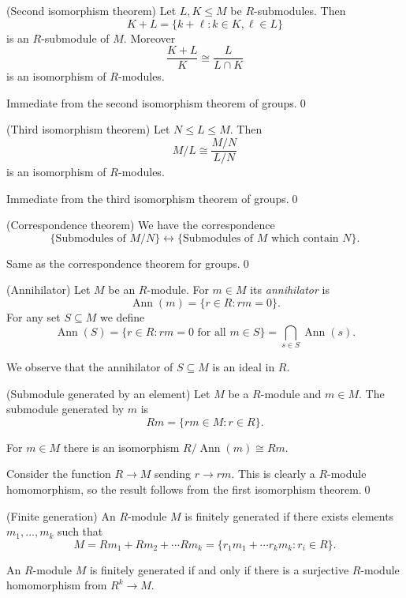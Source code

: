 \documentclass{article}
\DeclareMathOperator{\Ann}{Ann}
\begin{document}
\begin{itemize}
\begin{theorem}
	(Second isomorphism theorem) Let $ L,K\le M $ be $ R $-submodules. Then
	\[
		K+L=\{k+\ell :k\in K, \ell\in L\} 
	\]
	is an $ R $-submodule of $ M $. Moreover
	\[
		\frac{K+L}K\cong \frac L{L\cap K}
	\]
	is an isomorphism of $ R $-modules.
\end{theorem}
\pf Immediate from the second isomorphism theorem of groups.\qed
\begin{theorem}
	(Third isomorphism theorem) Let $ N\le L\le M $. Then
	\[
		M/L\cong\frac{M/N}{L/N}
	\]
	is an isomorphism of $ R $-modules.
\end{theorem}
\pf Immediate from the third isomorphism theorem of groups.\qed
\begin{theorem}
	(Correspondence theorem) We have the correspondence
	\[
		\{\text{Submodules of } M/N\}\leftrightarrow{} \{\text{Submodules of } M \text{ which contain } N \}.
	\]
\end{theorem}
\pf Same as the correspondence theorem for groups.\qed
\begin{definition}
	(Annihilator) Let $ M $ be an $ R $-module. For $ m\in M $ its \textit{annihilator} is 
	\[
		\Ann(m)=\{r\in R:rm=0\}.
	\]
	For any set $ S\subseteq M $ we define
	\[
		\Ann(S)=\{r\in R:rm=0\text{ for all } m \in S\}=\bigcap_{s\in S}\Ann(s).
	\]
\end{definition}
We observe that the annihilator of $ S\subseteq M $ is an ideal in $ R $.
\begin{definition}
(Submodule generated by an element) Let $ M $ be a $ R $-module and $ m\in M $. The submodule generated by $ m $ is
\[
	Rm=\{rm\in M:r\in R\}.
\]
\end{definition}
\begin{proposition}
  For $ m\in M $ there is an isomorphism $ R/\Ann(m)\cong Rm $.
\end{proposition}
\pf Consider the function $ R\to M $ sending $ r\to rm $. This is clearly a $ R $-module homomorphism, so the result follows from the first isomorphism theorem.\qed
\begin{definition}
	(Finite generation) An $ R $-module $ M $ is finitely generated if there exists elements $ m_1,\dots,m_k $ such that
	\[
		M=Rm_1+Rm_2+\cdots Rm_k=\{r_1m_1+\cdots r_km_k:r_i\in R\}.
	\]
\end{definition}
\begin{lemma}
  An $ R $-module $ M $ is finitely generated if and only if there is a surjective $ R $-module homomorphism from $ R^k\to M $.
\end{lemma}

\end{itemize}
\end{document}
